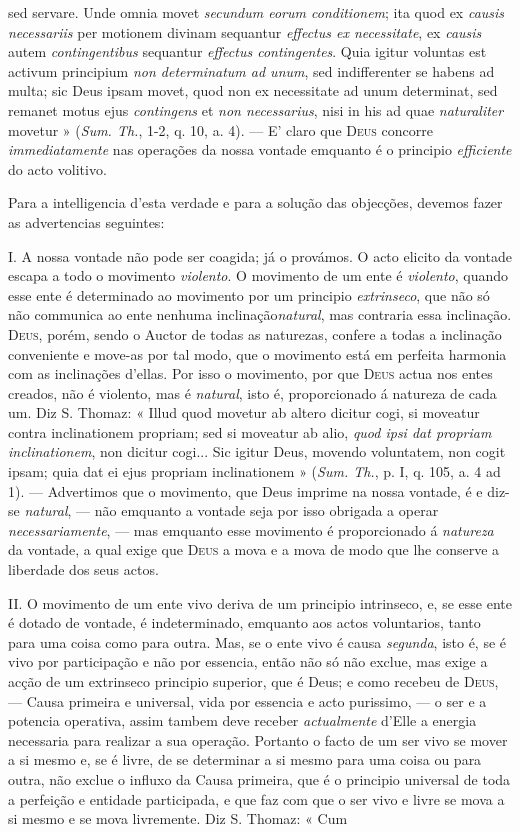 sed servare. Unde omnia movet \emph{secundum eorum conditionem}; ita quod ex \emph{causis necessariis} per motionem divinam sequantur \emph{effectus ex necessitate}, ex \emph{causis} autem \emph{contingentibus} sequantur \emph{effectus contingentes}. Quia igitur voluntas est activum principium \emph{non determinatum ad unum}, sed indifferenter se habens ad multa; sic Deus ipsam movet, quod non ex necessitate ad unum determinat, sed remanet motus ejus \emph{contingens} et \emph{non necessarius}, nisi in his ad quae \emph{naturaliter} movetur » (\emph{Sum. Th.}, 1-2, q. 10, a. 4). --- E' claro que \textsc{Deus} concorre \emph{immediatamente} nas operações da nossa vontade emquanto é o principio \emph{efficiente} do acto volitivo.\par Para a intelligencia d'esta verdade e para a solução das objecções, devemos fazer as advertencias seguintes:\par I. A nossa vontade não pode ser coagida; já o provámos. O acto elicito da vontade escapa a todo o movimento \emph{violento}. O movimento de um ente é \emph{violento}, quando esse ente é determinado ao movimento por um principio \emph{extrinseco}, que não só não communica ao ente nenhuma inclinação\emph{natural}, mas contraria essa inclinação. \textsc{Deus}, porém, sendo o Auctor de todas as naturezas, confere a todas a inclinação conveniente e move-as por tal modo, que o movimento está em perfeita harmonia com as inclinações d'ellas. Por isso o movimento, por que \textsc{Deus} actua nos entes creados, não é violento, mas é \emph{natural}, isto é, proporcionado á natureza de cada um. Diz S. Thomaz: « Illud quod movetur ab altero dicitur cogi, si moveatur contra inclinationem propriam; sed si moveatur ab alio, \emph{quod ipsi dat propriam inclinationem}, non dicitur cogi... Sic igitur Deus, movendo voluntatem, non cogit ipsam; quia dat ei ejus propriam inclinationem » (\emph{Sum. Th.}, p. I, q. 105, a. 4 ad 1). --- Advertimos que o movimento, que Deus imprime na nossa vontade, é e diz-se \emph{natural}, --- não emquanto a vontade seja por isso obrigada a operar \emph{necessariamente}, --- mas emquanto esse movimento é proporcionado á \emph{natureza} da vontade, a qual exige que \textsc{Deus} a mova e a mova de modo que lhe conserve a liberdade dos seus actos.\par II. O movimento de um ente vivo deriva de um principio intrinseco, e, se esse ente é dotado de vontade, é indeterminado, emquanto aos actos voluntarios, tanto para uma coisa como para outra. Mas, se o ente vivo é causa \emph{segunda}, isto é, se é vivo por participação e não por essencia, então não só não exclue, mas exige a acção de um extrinseco principio superior, que é Deus; e como recebeu de \textsc{Deus}, --- Causa primeira e universal, vida por essencia e acto purissimo, --- o ser e a potencia operativa, assim tambem deve receber \emph{actualmente} d'Elle a energia necessaria para realizar a sua operação. Portanto o facto de um ser vivo se mover a si mesmo e, se é livre, de se determinar a si mesmo para uma coisa ou para outra, não exclue o influxo da Causa primeira, que é o principio universal de toda a perfeição e entidade participada, e que faz com que o ser vivo e livre se mova a si mesmo e se mova livremente. Diz S. Thomaz: « Cum 